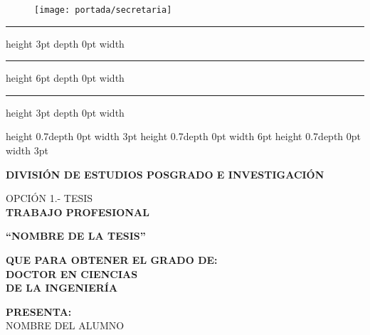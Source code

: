 \begin{titlepage}
    \vspace*{-2cm}
    \begin{figure}[H]
        \texttt{[image: portada/secretaria]}
    \end{figure}

    \hrule height 3pt depth 0pt width \textwidth
    \vspace{2pt}
    \hrule height 6pt depth 0pt width \textwidth
    \vspace{2pt}
    \hrule height 3pt depth 0pt width \textwidth

    \hspace{12pt}
    \vrule height 0.7\textheight depth 0pt width 3pt
    \hspace{-1pt}
    \vrule height 0.7\textheight depth 0pt width 6pt
    \hspace{-1pt}
    \vrule height 0.7\textheight depth 0pt width 3pt

    \vspace*{-165mm}

    \begin{center}
        \textbf{DIVISIÓN DE ESTUDIOS POSGRADO E INVESTIGACIÓN}
    \end{center}

    \vspace{0.2\baselineskip}
    \begin{center}
        \fontsize{11}{12}\selectfont OPCIÓN 1.- TESIS \\
        \fontsize{12}{12}\selectfont \textbf{TRABAJO PROFESIONAL}
    \end{center}

    \vspace{0.5\baselineskip}
    \begin{center}
        \textbf{``NOMBRE DE LA TESIS''} %
    \end{center}

    \vspace{0.5\baselineskip}
    \begin{center}
        \fontsize{11}{12}\selectfont \textbf{QUE PARA OBTENER EL GRADO DE:} \\
        \fontsize{12}{12}\selectfont \textbf{DOCTOR EN CIENCIAS} \\
        \fontsize{12}{12}\selectfont \textbf{DE LA INGENIERÍA}
    \end{center}

    \vspace{0.5\baselineskip}
    \begin{center}
        \fontsize{11}{12}\selectfont \textbf{PRESENTA:} \\
        \fontsize{12}{12}\selectfont NOMBRE DEL ALUMNO %
    \end{center}


\end{titlepage}
